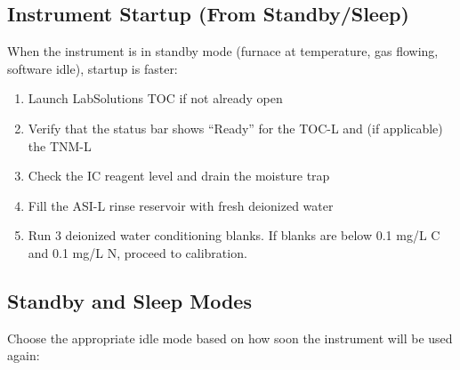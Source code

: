 \documentclass[
  11pt,
  letterpaper,
]{article}
\providecommand{\tightlist}{%
  \setlength{\itemsep}{0pt}\setlength{\parskip}{0pt}}
\begin{document}
\subsection{Instrument Startup (From
Standby/Sleep)}\label{instrument-startup-from-standbysleep}

When the instrument is in standby mode (furnace at temperature, gas
flowing, software idle), startup is faster:

\begin{enumerate}
\def\labelenumi{\arabic{enumi}.}
\tightlist
\item
  Launch LabSolutions TOC if not already open
\item
  Verify that the status bar shows ``Ready'' for the TOC-L and (if
  applicable) the TNM-L
\item
  Check the IC reagent level and drain the moisture trap
\item
  Fill the ASI-L rinse reservoir with fresh deionized water
\item
  Run 3 deionized water conditioning blanks. If blanks are below 0.1
  mg/L C and 0.1 mg/L N, proceed to calibration.
\end{enumerate}

\subsection{Standby and Sleep Modes}\label{standby-and-sleep-modes}

Choose the appropriate idle mode based on how soon the instrument will
be used again:
\end{document}
